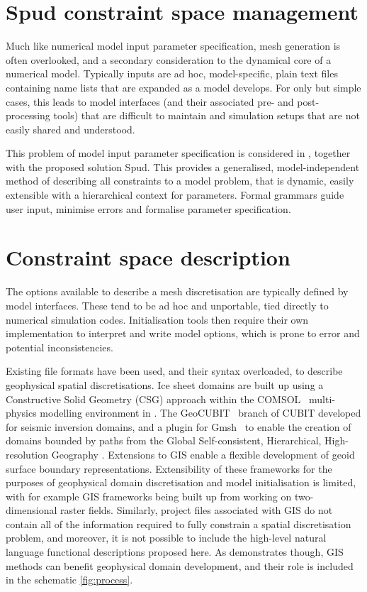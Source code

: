 \documentclass[a4paper, 10pt]{book}
\providecommand{\breps}{boundary representations\xspace}
\providecommand{\twod}{two-dimensional\xspace}
\begin{document}
\section{Spud constraint space management}
\label{sec:spud}
%
Much like numerical model input parameter specification, mesh generation is often overlooked, and a secondary consideration to the dynamical core of a numerical model.
Typically inputs are ad hoc, model-specific, plain text files containing name lists that are expanded as a model develops.
For only but simple cases, this leads to model interfaces (and their associated pre- and post-processing tools) that are difficult to maintain
and simulation setups that are not easily shared and understood.

This problem of model input parameter specification is considered in \cite{ham09},
together with the proposed solution Spud.
%
This provides a generalised, model-independent method of describing all constraints to a model problem,
that is dynamic, easily extensible with a hierarchical context for parameters.
%
Formal grammars guide user input, minimise errors and formalise parameter specification.

\section{Constraint space description}
The options
%
available to describe a mesh discretisation
are typically defined by model interfaces.
%
These tend to be ad hoc and unportable, tied directly to numerical simulation codes.
%
Initialisation tools then require their own implementation to interpret and write model options, which is prone to error and potential inconsistencies.


Existing file formats have been used,
and their syntax overloaded,
to describe geophysical spatial discretisations.
Ice sheet domains are built up using a Constructive Solid Geometry (CSG) approach within
the COMSOL~\citep{comsol,li09} multi-physics modelling environment in \cite{humbert09}.
The GeoCUBIT~\citep{geocubit} branch of CUBIT developed for seismic inversion domains,
and a plugin for Gmsh~\citep{gmsh} to enable the creation of domains bounded by paths from
the Global Self-consistent, Hierarchical, High-resolution Geography \cite[GSHHG,][]{gshhs}.
Extensions to GIS \citep[e.g.][]{candygis} enable a flexible development of geoid surface \breps.
Extensibility of these frameworks 
for the purposes of geophysical domain discretisation and model initialisation
is limited,
with for example GIS frameworks being built up from working on \twod raster fields.
Similarly, project files associated with GIS do not contain all of the information required to fully
%
constrain a spatial discretisation problem,
and moreover, it is not possible to include the high-level natural language functional descriptions proposed here.
%
As \cite{candygis} demonstrates though, GIS methods can benefit geophysical domain development, and their role is included in the schematic \cref{fig:process}.
\end{document}
